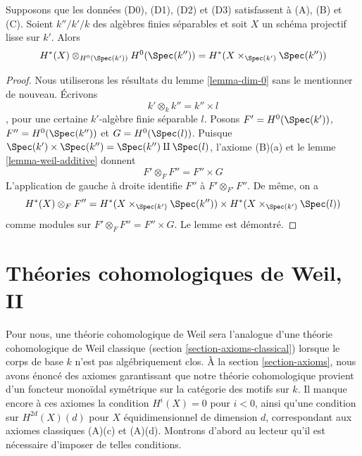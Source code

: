 \begin{lemma}
\label{lemma-otimes}
Supposons que les données (D0), (D1), (D2) et (D3) satisfassent à (A), (B) et (C). Soient
$k''/k'/k$ des algèbres finies séparables et soit $X$ un
schéma projectif lisse sur $k'$. Alors
$$
H^*(X) \otimes_{H^0(\Spec(k'))} H^0(\Spec(k'')) =
H^*(X \times_{\Spec(k')} \Spec(k''))
$$
\end{lemma}

\begin{proof}
Nous utiliserons les résultats du lemme \ref{lemma-dim-0} sans le mentionner de nouveau.
Écrivons
$$
k' \otimes_k k'' = k'' \times l
$$,
pour une certaine $k'$-algèbre finie séparable $l$. Posons
$F' = H^0(\Spec(k'))$, $F'' = H^0(\Spec(k''))$ et $G = H^0(\Spec(l))$.
Puisque $\Spec(k') \times \Spec(k'') = \Spec(k'') \amalg \Spec(l)$,
l'axiome (B)(a) et le lemme \ref{lemma-weil-additive}
donnent
$$
F' \otimes_F F'' = F'' \times G
$$
L'application de gauche à droite identifie $F''$ à $F' \otimes_{F'} F''$.
De même, on a
$$
H^*(X) \otimes_F F'' = H^*(X \times_{\Spec(k')} \Spec(k''))
\times H^*(X \times_{\Spec(k')} \Spec(l))
$$
comme modules sur $F' \otimes_F F'' = F'' \times G$. Le lemme est démontré.
\end{proof}






















\section{Théories cohomologiques de Weil, II}
\label{section-old}

\noindent
Pour nous, une théorie cohomologique de Weil sera l'analogue d'une
théorie cohomologique de Weil classique (section \ref{section-axioms-classical})
lorsque le corps de base $k$ n'est pas algébriquement clos.
À la section \ref{section-axioms}, nous avons énoncé des axiomes garantissant
que notre théorie cohomologique provient d'un foncteur monoïdal symétrique
sur la catégorie des motifs sur $k$. Il manque encore à ces axiomes
la condition $H^i(X) = 0$ pour $i < 0$, ainsi
qu'une condition sur $H^{2d}(X)(d)$ pour $X$ équidimensionnel de dimension $d$,
correspondant aux axiomes classiques (A)(c) et (A)(d).
Montrons d'abord au lecteur qu'il est nécessaire d'imposer
de telles conditions.

